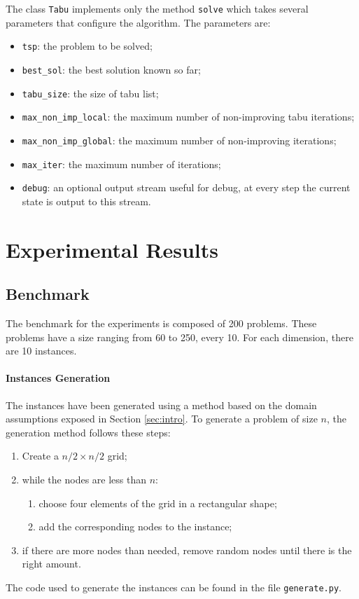 \documentclass{article}
\begin{document}
The class \texttt{Tabu} implements only the method \texttt{solve} which takes several parameters that configure the algorithm.
The parameters are:
\begin{itemize}
    \item \texttt{tsp}: the problem to be solved;
    \item \texttt{best\_sol}: the best solution known so far;
    \item \texttt{tabu\_size}: the size of tabu list;
    \item \texttt{max\_non\_imp\_local}: the maximum number of non-improving tabu iterations;
    \item \texttt{max\_non\_imp\_global}: the maximum number of non-improving iterations;
    \item \texttt{max\_iter}: the maximum number of iterations;
    \item \texttt{debug}: an optional output stream useful for debug, at every step the current state is output to this stream.
\end{itemize}

\section{Experimental Results}

\subsection{Benchmark}
The benchmark for the experiments is composed of 200 problems.
These problems have a size ranging from 60 to 250, every 10.
For each dimension, there are 10 instances.

\paragraph{Instances Generation}
The instances have been generated using a method based on the domain assumptions exposed in Section \ref{sec:intro}.
To generate a problem of size $n$, the generation method follows these steps:
\begin{enumerate}
    \item Create a $n/2 \times n/2$ grid;
    \item while the nodes are less than $n$:
          \begin{enumerate}
              \item choose four elements of the grid in a rectangular shape;
              \item add the corresponding nodes to the instance;
          \end{enumerate}
    \item if there are more nodes than needed, remove random nodes until there is the right amount.
\end{enumerate}
The code used to generate the instances can be found in the file \texttt{generate.py}.
\end{document}
